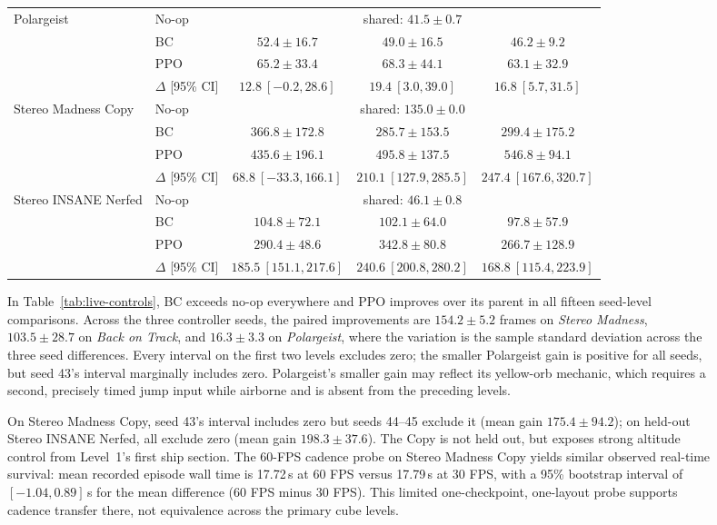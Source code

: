 \begin{figure}[!htbp]
\begin{table}[H]
\begin{tabular}{@{}>{\raggedright\arraybackslash}p{}lccc@{}}
    \addlinespace
    Polargeist & No-op & \multicolumn{3}{c}{shared: $41.5\pm0.7$} \\
       & BC & $52.4\pm16.7$ & $49.0\pm16.5$ & $46.2\pm9.2$ \\
       & PPO & $\boldsymbol{65.2\pm33.4}$ & $\boldsymbol{68.3\pm44.1}$ & $\boldsymbol{63.1\pm32.9}$ \\
       & $\Delta$ [95\% CI] & $12.8\ [-0.2,28.6]$ & $19.4\ [3.0,39.0]$ & $16.8\ [5.7,31.5]$ \\
    \midrule
    Stereo Madness Copy & No-op & \multicolumn{3}{c}{shared: $135.0\pm0.0$} \\
       & BC & $366.8\pm172.8$ & $285.7\pm153.5$ & $299.4\pm175.2$ \\
       & PPO & $\boldsymbol{435.6\pm196.1}$ & $\boldsymbol{495.8\pm137.5}$ & $\boldsymbol{546.8\pm94.1}$ \\
       & $\Delta$ [95\% CI] & $68.8\ [-33.3,166.1]$ & $210.1\ [127.9,285.5]$ & $247.4\ [167.6,320.7]$ \\
    \addlinespace
    Stereo INSANE Nerfed & No-op & \multicolumn{3}{c}{shared: $46.1\pm0.8$} \\
       & BC & $104.8\pm72.1$ & $102.1\pm64.0$ & $97.8\pm57.9$ \\
       & PPO & $\boldsymbol{290.4\pm48.6}$ & $\boldsymbol{342.8\pm80.8}$ & $\boldsymbol{266.7\pm128.9}$ \\
       & $\Delta$ [95\% CI] & $185.5\ [151.1,217.6]$ & $240.6\ [200.8,280.2]$ & $168.8\ [115.4,223.9]$ \\
    \bottomrule
  \end{tabular}
\end{table}

In Table~\ref{tab:live-controls}, BC exceeds no-op everywhere and PPO improves over its parent in all fifteen seed-level comparisons.
Across the three controller seeds, the paired improvements are $154.2\pm5.2$ frames on \emph{Stereo Madness}, $103.5\pm28.7$ on \emph{Back on Track}, and $16.3\pm3.3$ on \emph{Polargeist}, where the variation is the sample standard deviation across the three seed differences.
Every interval on the first two levels excludes zero; the smaller Polargeist gain is positive for all seeds, but seed 43's interval marginally includes zero.
Polargeist's smaller gain may reflect its yellow-orb mechanic, which requires a second, precisely timed jump input while airborne and is absent from the preceding levels.

On Stereo Madness Copy, seed 43's interval includes zero but seeds 44--45 exclude it (mean gain $175.4\pm94.2$); on held-out Stereo INSANE Nerfed, all exclude zero (mean gain $198.3\pm37.6$).
The Copy is not held out, but exposes strong altitude control from Level~1's first ship section.
The 60-FPS cadence probe on Stereo Madness Copy yields similar observed real-time survival: mean recorded episode wall time is 17.72\,s at 60 FPS versus 17.79\,s at 30 FPS, with a 95\% bootstrap interval of $[-1.04,0.89]$\,s for the mean difference (60 FPS minus 30 FPS).
This limited one-checkpoint, one-layout probe supports cadence transfer there, not equivalence across the primary cube levels.


\end{figure}
